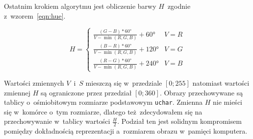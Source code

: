 Ostatnim krokiem algorytmu jest obliczenie barwy $H$~zgodnie z~wzorem~\ref{eqn:hue}.

\begin{equation}
    \label{eqn:hue}
    H = \left\{ 
        \begin{array}{ll}
            \frac{(G - B) * 60\si{\degree}}{V - \min{(R, G, B)}} + 60\si{\degree} & V = R \\
            \frac{(B - R) * 60\si{\degree}}{V - \min{(R, G, B)}} + 120\si{\degree} & V = G \\
            \frac{(R - G) * 60\si{\degree}}{V - \min{(R, G, B)}} + 240\si{\degree} & V = B
        \end{array} 
        \right.
\end{equation}
\smallskip

Wartości zmiennych $V$~i~$S$ mieszczą się w~przedziale $[0; 255]$ natomiast wartości zmiennej $H$ są ograniczone przez przedział $[0; 360]$. Obrazy przechowywane są tablicy o~ośmiobitowym rozmiarze podstawowym \texttt{uchar}. Zmienna $H$ nie mieści się w~komórce o~tym rozmiarze, dlatego też zdecydowałem się na przechowywanie w~tablicy wartości $\frac{H}{2}$. Podział ten jest solidnym kompromisem pomiędzy dokładnością reprezentacji a~rozmiarem obrazu w~pamięci komputera.